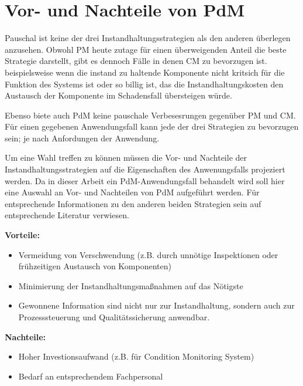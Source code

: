 \section{Vor- und Nachteile von PdM}
\label{sec:vorteile_nachteile_pdm}

Pauschal ist keine der drei Instandhaltungsstrategien als den anderen überlegen anzusehen. Obwohl PM heute zutage für einen überweigenden Anteil die beste Strategie darstellt, gibt es dennoch Fälle in denen CM zu bevorzugen ist. beispielsweise wenn die instand zu haltende Komponente nicht kritsich für die Funktion des Systems ist oder so billig ist, das die Instandhaltungskosten den Austausch der Komponente im Schadensfall übersteigen würde.

Ebenso biete auch PdM keine pauschale Verbesesrungen gegenüber PM und CM. Für einen gegebenen Anwendungsfall kann jede der drei Strategien zu bevorzugen sein; je nach Anfordungen der Anwendung.

Um eine Wahl treffen zu können müssen die Vor- und Nachteile der Instandhaltungsstrategien auf die Eigenschaften des Anwenungsfalls projeziert werden. Da in dieser Arbeit ein PdM-Anwendungsfall behandelt wird soll hier eine Auswahl an Vor- und Nachteilen von PdM aufgeführt werden. Für entsprechende Informationen zu den anderen beiden Strategien sein auf entsprechende Literatur verwiesen.

\textbf{Vorteile:}

\begin{itemize}
    \item Vermeidung von Verschwendung (z.B. durch unnötige Inspektionen oder frühzeitigen Austausch von Komponenten) \cite{Mobley.2002}
    \item Minimierung der Instandhaltungsmaßnahmen auf das Nötigste
    \item Gewonnene Information sind nicht nur zur Instandhaltung, sondern auch zur Prozesssteuerung und Qualitätssicherung anwendbar.
\end{itemize}

\textbf{Nachteile:}

\begin{itemize}
    \item Hoher Investionsaufwand (z.B. für Condition Monitoring System)
    \item Bedarf an entsprechendem Fachpersonal
\end{itemize}